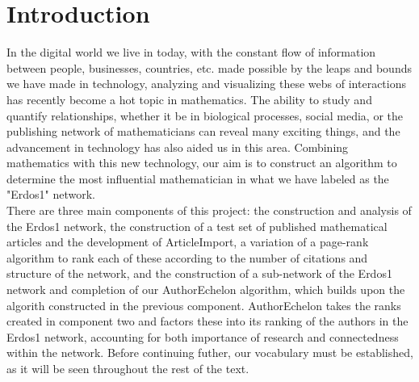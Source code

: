 \documentclass[12pt]{article} %
\begin{document}
\section{Introduction}
\indent In the digital world we live in today, with the constant flow of information between people, businesses, countries, etc. made possible by the leaps and bounds we have made in technology, analyzing and visualizing these webs of interactions has recently become a hot topic in mathematics. The ability to study and quantify relationships, whether it be in biological processes, social media, or the publishing network of mathematicians can reveal many exciting things, and the advancement in technology has also aided us in this area. Combining mathematics with this new technology, our aim is to construct an algorithm to determine the most influential mathematician in what we have labeled as the "Erdos1" network. \\
\indent There are three main components of this project: the construction and analysis of the Erdos1 network, the construction of a test set of published mathematical articles and the development of ArticleImport, a variation of a page-rank algorithm to rank each of these according to the number of citations and structure of the network, and the construction of a sub-network of the Erdos1 network and completion of our AuthorEchelon algorithm, which builds upon the algorith constructed in the previous component. AuthorEchelon takes the ranks created in component two and factors these into its ranking of the authors in the Erdos1 network, accounting for both importance of research and connectedness within the network. Before continuing futher, our vocabulary must be established, as it will be seen throughout the rest of the text.\\
\\
\end{document}
